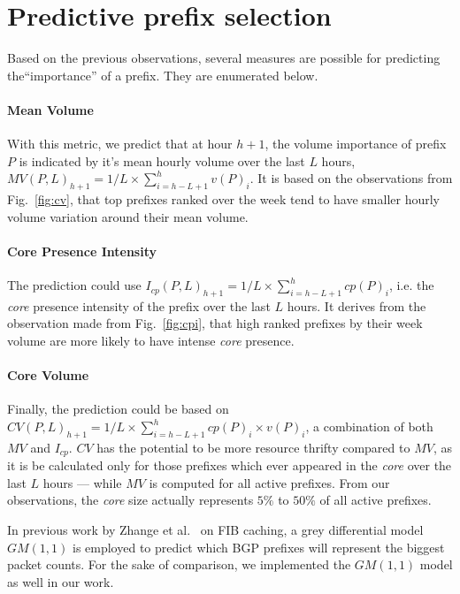 \documentclass[10pt, conference,letterpaper]{IEEEtran}
\begin{document}
\section{Predictive prefix selection}
\label{sec:sele}
Based on the previous observations, several measures are possible for predicting the``importance'' of a prefix. They are enumerated below. 
\paragraph*{Mean Volume}
With this metric, we predict that at hour $h+1$, the volume importance of prefix $P$ is indicated by it's mean hourly volume over the last $L$ hours, $MV(P,L)_{h+1} = 1/L \times \sum_{i = h-L+1}^{h} v(P)_i$.
It is based on the observations from Fig.~\ref{fig:cv}, that top prefixes ranked over the week tend to have smaller hourly volume variation around their mean volume.
\paragraph*{Core Presence Intensity}
The prediction could use $I_{cp}(P,L)_{h+1} = 1/L \times \sum_{i = h-L+1}^{h} cp(P)_i$, i.e. the \textit{core} presence intensity of the prefix over the last $L$ hours. It derives from the observation made from Fig.~\ref{fig:cpi}, that high ranked prefixes by their week volume are more likely to have intense \textit{core} presence.

\paragraph*{Core Volume}
Finally, the prediction could be based on $CV(P,L)_{h+1} = 1/L \times \sum_{i = h-L+1}^{h} cp(P)_i \times v(P)_i$,  a combination of both $MV$ and $I_{cp}$.
$CV$ has the potential to be more resource thrifty compared to $MV$, as it is be calculated only for those prefixes which ever appeared in the \textit{core} over the last $L$ hours --- while $MV$ is computed for all active prefixes. From our observations, the \textit{core} size actually represents $5\%$ to $50\%$ of all active prefixes.

In previous work by Zhange et al.\ \cite{Zhang2012} on FIB caching, a grey differential model $GM(1,1)$ \cite{Julong1989} is employed to  predict which BGP prefixes will represent the  biggest packet counts. For the sake of comparison, we implemented the $GM(1,1)$ model as well in our work. 
\end{document}
